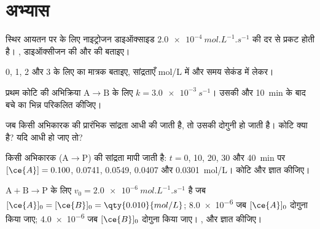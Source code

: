 \section{अभ्यास}

\begin{exercise}[$\star$]\label{exo:b1:rate-laws:1}
स्थिर आयतन पर  के लिए नाइट्रोजन डाइऑक्साइड
$\qty{2.0e-4}{mol.L^{-1}.s^{-1}}$ की दर से प्रकट होती है। , डाइऑक्सीजन की
 और  की  बताइए।
\end{exercise}

\begin{exercise}[$\star$]\label{exo:b1:rate-laws:2}
 0, 1, 2 और 3 के लिए  का मात्रक बताइए,
सांद्रताएँ \unit{mol/L} में और समय सेकंड में लेकर।
\end{exercise}

\begin{exercise}[$\star$]\label{exo:b1:rate-laws:3}
प्रथम कोटि की अभिक्रिया $\mathrm{A} \longrightarrow \mathrm{B}$ के लिए $k = \qty{3.0e-3}{s^{-1}}$। उसकी
 और \qty{10}{min} के बाद बचे  का भिन्न परिकलित कीजिए।
\end{exercise}

\begin{exercise}[$\star$]\label{exo:b1:rate-laws:4}
जब किसी अभिकारक की प्रारंभिक सांद्रता आधी की जाती है, तो उसकी 
दोगुनी हो जाती है। कोटि क्या है? यदि  आधी हो जाए तो?
\end{exercise}

\begin{exercise}[$\star\star$]\label{exo:b1:rate-laws:5}
किसी अभिकारक  ($\mathrm{A} \longrightarrow \mathrm{P}$) की सांद्रता मापी जाती है: $t
= 0$, 10, 20, 30 और \qty{40}{min} पर $[\ce{A}] = 0.100$, 0.0741, 0.0549,
0.0407 और \qty{0.0301}{mol/L}। कोटि और  ज्ञात कीजिए।
\end{exercise}

\begin{exercise}[$\star\star$]\label{exo:b1:rate-laws:6}
$\mathrm{A} + \mathrm{B} \longrightarrow \mathrm{P}$ के लिए $v_0 = \qty{2.0e-6}{mol.L^{-1}.s^{-1}}$ है जब $[\ce{A}]_0
= [\ce{B}]_0 = \qty{0.010}{mol/L}$; \qty{8.0e-6}{} जब $[\ce{A}]_0$
दोगुना किया जाए; \qty{4.0e-6}{} जब $[\ce{B}]_0$ दोगुना किया जाए। ,  और  ज्ञात कीजिए।
\end{exercise}

